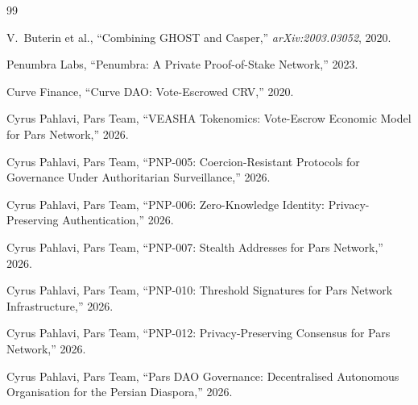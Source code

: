 \documentclass[11pt,a4paper]{article}
\begin{document}
\begin{thebibliography}{99}

V.~Buterin et al.,
``Combining GHOST and Casper,''
\emph{arXiv:2003.03052}, 2020.

Penumbra Labs,
``Penumbra: A Private Proof-of-Stake Network,''
2023.

Curve Finance,
``Curve DAO: Vote-Escrowed CRV,''
2020.

Cyrus Pahlavi, Pars Team,
``VEASHA Tokenomics: Vote-Escrow Economic Model for Pars Network,''
2026.

Cyrus Pahlavi, Pars Team,
``PNP-005: Coercion-Resistant Protocols for Governance Under
Authoritarian Surveillance,''
2026.

Cyrus Pahlavi, Pars Team,
``PNP-006: Zero-Knowledge Identity: Privacy-Preserving Authentication,''
2026.

Cyrus Pahlavi, Pars Team,
``PNP-007: Stealth Addresses for Pars Network,''
2026.

Cyrus Pahlavi, Pars Team,
``PNP-010: Threshold Signatures for Pars Network Infrastructure,''
2026.

Cyrus Pahlavi, Pars Team,
``PNP-012: Privacy-Preserving Consensus for Pars Network,''
2026.

Cyrus Pahlavi, Pars Team,
``Pars DAO Governance: Decentralised Autonomous Organisation for the
Persian Diaspora,''
2026.

\end{thebibliography}
\end{document}
